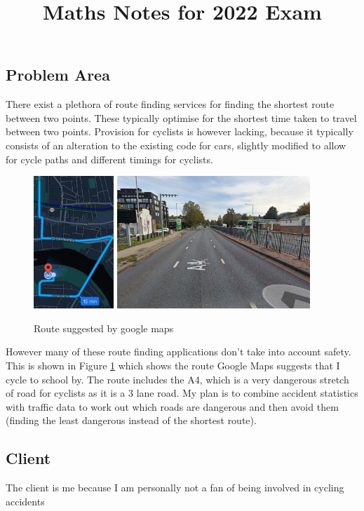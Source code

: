 \documentclass[11pt,twoside,a4paper]{article}
\title{Maths Notes for 2022 Exam}
\begin{document}
\subsection{Problem Area}
There exist a plethora of route finding services for finding the shortest route between two points. These typically optimise for the shortest time taken to travel between two points. Provision for cyclists is however lacking, because it typically consists of an alteration to the existing code for cars, slightly modified to allow for cycle paths and different timings for cyclists.\\
\begin{figure}[t]
    \begin{center}
        \includegraphics[height=5cm]{route.jpg}
    \includegraphics[height=5cm]{dangerous.png}
\end{center}
    \caption{Route suggested by google maps}
    \label{route}
\end{figure}
However many of these route finding applications don't take into account safety. This is shown in Figure \ref{route} which shows the route Google Maps suggests that I cycle to school by. The route includes the A4, which is a very dangerous stretch of road for cyclists as it is a 3 lane road. 
My plan is to combine accident statistics with traffic data to work out which roads are dangerous and then avoid them (finding the least dangerous instead of the shortest route).
\subsection{Client}
The client is me because I am personally not a fan of being involved in cycling accidents
\end{document}
